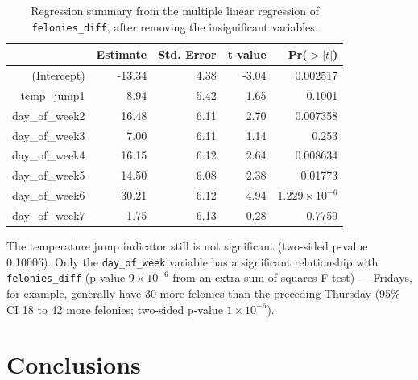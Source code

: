 \documentclass[11pt,notitlepage]{article}
\begin{document}
\begin{table}[ht]
\vspace*{-1mm}
\footnotesize
\centering
\begin{tabular}{rrrrr}
  \hline
 & Estimate & Std. Error & t value & Pr($>|t|$) \\ 
  \hline
(Intercept) & -13.34 & 4.38 & -3.04 & 0.002517 \\ 
  temp\_jump1 & 8.94 & 5.42 & 1.65 & 0.1001 \\ 
  day\_of\_week2 & 16.48 & 6.11 & 2.70 & 0.007358 \\ 
  day\_of\_week3 & 7.00 & 6.11 & 1.14 & 0.253 \\ 
  day\_of\_week4 & 16.15 & 6.12 & 2.64 & 0.008634 \\ 
  day\_of\_week5 & 14.50 & 6.08 & 2.38 & 0.01773 \\ 
  day\_of\_week6 & 30.21 & 6.12 & 4.94 & $1.229 \times 10^{-6}$ \\ 
  day\_of\_week7 & 1.75 & 6.13 & 0.28 & 0.7759 \\ 
   \hline
\end{tabular}
\captionsetup{width=0.9\textwidth}
\vspace*{-2mm}
\caption{Regression summary from the multiple linear regression of \texttt{felonies_diff}, after removing the insignificant variables.}
\label{tab:lmd6}   
\vspace*{-3mm}
\end{table}






The temperature jump indicator still is not significant (two-sided p-value 0.10006). Only the \texttt{day_of_week} variable has a significant relationship with \texttt{felonies_diff} (p-value $9 \times 10^{-6}$ from an extra sum of squares F-test) --- Fridays, for example, generally have 30 more felonies than the preceding Thursday (95\% CI 18 to 42 more felonies; two-sided p-value $1 \times 10^{-6}$).


\section{Conclusions}
\label{sec:conclusions}
\end{document}
